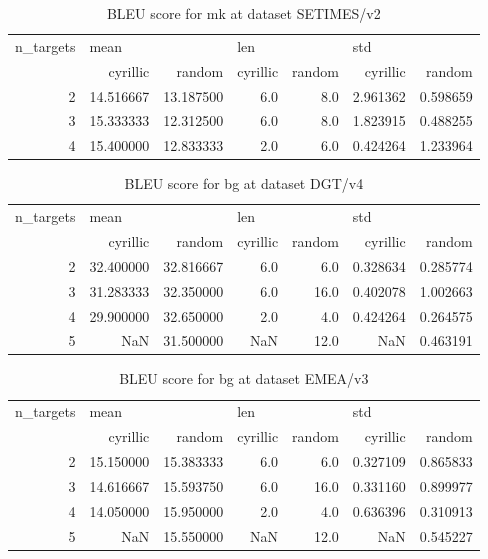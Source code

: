 \begin{table}[h]
\begin{tabular}{rrrrrrr}
\toprule
n\_targets & \multicolumn{2}{l}{mean} & \multicolumn{2}{l}{len} & \multicolumn{2}{l}{std} \\
          &   cyrillic &     random & cyrillic & random &  cyrillic &    random \\
\midrule
        2 &  14.516667 &  13.187500 &      6.0 &    8.0 &  2.961362 &  0.598659 \\
        3 &  15.333333 &  12.312500 &      6.0 &    8.0 &  1.823915 &  0.488255 \\
        4 &  15.400000 &  12.833333 &      2.0 &    6.0 &  0.424264 &  1.233964 \\
\bottomrule
\end{tabular}

\caption{BLEU score for  mk at dataset SETIMES/v2 }
\label{ table:mk/SETIMES/v2 }
\end{table}

\begin{table}[h]
\begin{tabular}{rrrrrrr}
\toprule
n\_targets & \multicolumn{2}{l}{mean} & \multicolumn{2}{l}{len} & \multicolumn{2}{l}{std} \\
          &   cyrillic &     random & cyrillic & random &  cyrillic &    random \\
\midrule
        2 &  32.400000 &  32.816667 &      6.0 &    6.0 &  0.328634 &  0.285774 \\
        3 &  31.283333 &  32.350000 &      6.0 &   16.0 &  0.402078 &  1.002663 \\
        4 &  29.900000 &  32.650000 &      2.0 &    4.0 &  0.424264 &  0.264575 \\
        5 &        NaN &  31.500000 &      NaN &   12.0 &       NaN &  0.463191 \\
\bottomrule
\end{tabular}

\caption{BLEU score for  bg at dataset DGT/v4 }
\label{ table:bg/DGT/v4 }
\end{table}

\begin{table}[h]
\begin{tabular}{rrrrrrr}
\toprule
n\_targets & \multicolumn{2}{l}{mean} & \multicolumn{2}{l}{len} & \multicolumn{2}{l}{std} \\
          &   cyrillic &     random & cyrillic & random &  cyrillic &    random \\
\midrule
        2 &  15.150000 &  15.383333 &      6.0 &    6.0 &  0.327109 &  0.865833 \\
        3 &  14.616667 &  15.593750 &      6.0 &   16.0 &  0.331160 &  0.899977 \\
        4 &  14.050000 &  15.950000 &      2.0 &    4.0 &  0.636396 &  0.310913 \\
        5 &        NaN &  15.550000 &      NaN &   12.0 &       NaN &  0.545227 \\
\bottomrule
\end{tabular}

\caption{BLEU score for  bg at dataset EMEA/v3 }
\label{ table:bg/EMEA/v3 }
\end{table}

